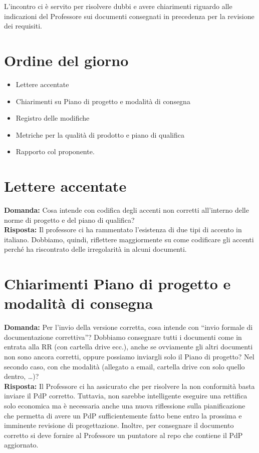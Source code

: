 \documentclass{article}
\begin{document}
L'incontro ci è servito per risolvere dubbi e avere chiarimenti riguardo alle indicazioni del Professore sui documenti consegnati in precedenza per la revisione dei requisiti.

\section{Ordine del giorno}%
\label{sec:ordine_del_giorno}

\begin{itemize}
  \item Lettere accentate
  \item Chiarimenti su Piano di progetto e modalità di consegna
  \item Registro delle modifiche
  \item Metriche per la qualità di prodotto e piano di qualifica
  \item Rapporto col proponente.
\end{itemize}

\section{Lettere accentate}%
\label{sec:lettere_accentate}

\textbf{Domanda:} Cosa intende con codifica degli accenti non corretti all'interno delle norme di progetto e del piano di qualifica? \\
\textbf{Risposta:} Il professore ci ha rammentato l'esistenza di due tipi di accento in italiano.
Dobbiamo, quindi, riflettere maggiormente su come codificare gli accenti perché ha riscontrato delle irregolarità in alcuni documenti.

\section{Chiarimenti Piano di progetto e modalità di consegna}%
\label{sec:piano_di_progetto_e_modalita_di_consegna}

\textbf{Domanda:} Per l'invio della versione corretta, cosa intende con “invio formale di documentazione correttiva”?
Dobbiamo consegnare tutti i documenti come in entrata alla RR (con cartella drive ecc.), anche se ovviamente gli altri documenti non sono ancora corretti, oppure possiamo inviargli solo il Piano di progetto?
Nel secondo caso, con che modalità (allegato a email, cartella drive con solo quello dentro, …)?\\
\textbf{Risposta:} Il Professore ci ha assicurato che per risolvere la non conformità basta inviare il PdP corretto.
Tuttavia, non sarebbe intelligente eseguire una rettifica solo economica ma è necessaria anche una nuova riflessione sulla pianificazione che permetta di avere un PdP sufficientemente fatto bene entro la prossima e imminente revisione di progettazione.
Inoltre, per consegnare il documento corretto si deve fornire al Professore un puntatore al repo che contiene il PdP aggiornato.
\end{document}
